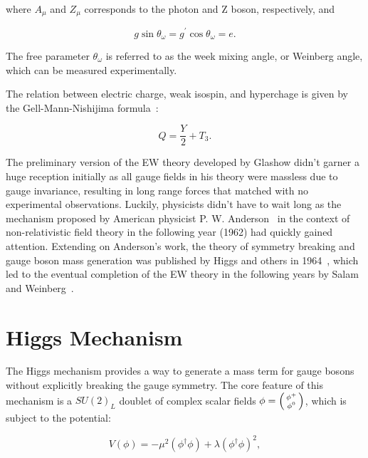 where $A_{\mu}$ and $Z_{\mu}$ corresponds to the photon and Z boson, respectively, and 

\begin{equation}
\label{eq:MixAngle}
g\sin\theta_{\omega}=g^{\prime}\cos\theta_{\omega}=e.
\end{equation}

The free parameter $\theta_{\omega}$ is referred to as the week mixing angle, or Weinberg angle, which can be measured experimentally.

The relation between electric charge, weak isospin, and hyperchage is given by the Gell-Mann-Nishijima formula~\cite{Nakano:1953zz,Gell-Mann:1956iqa}:

\begin{equation}
Q=\frac{Y}{2}+T_{3}.
\end{equation}

The preliminary version of the \ac{EW} theory developed by Glashow didn't garner a huge reception initially as all gauge fields in his theory were massless due to gauge invariance, resulting in long range forces that matched with no experimental observations. Luckily, physicists didn't have to wait long as the mechanism proposed by American physicist P. W. Anderson~\cite{Anderson:1963pc} in the context of non-relativistic field theory in the following year (1962) had quickly gained attention. Extending on Anderson's work, the theory of symmetry breaking and gauge boson mass generation was published by Higgs and others in 1964~\cite{PhysRevLett.13.321,PhysRevLett.13.508,PhysRevLett.13.585}, which led to the eventual completion of the \ac{EW} theory in the following years by Salam and Weinberg~\cite{Salam:1964ry,Weinberg:1967tq}.

\section{Higgs Mechanism}
\label{sec:Higgs}

The Higgs mechanism provides a way to generate a mass term for gauge bosons without explicitly breaking the gauge symmetry. The core feature of this mechanism is a $SU(2)_{L}$ doublet of complex scalar fields $\phi=\begin{psmallmatrix}\phi^{+}\\\phi^{0}\end{psmallmatrix}$, which is subject to the potential:

\begin{equation}
V(\phi)=-\mu^2(\phi^{\dagger}\phi)+\lambda(\phi^{\dagger}\phi)^2,
\end{equation}

